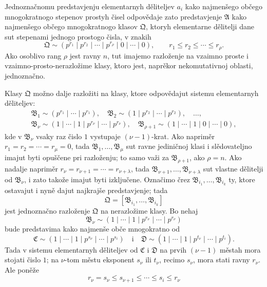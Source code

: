 \documentclass[11pt]{article}
\begin{document}
Jednoznačnomu predstavjenju elementarnyh děliteljev \(a_i\) kako najmenšego občego mnogokratnogo stepenov prostyh čisel odpovědaje zato predstavjenje \(\mathfrak A\) kako najmenšego občego mnogokratnogo klasov \(\mathfrak Q\), ktoryh elementarne dělitelji dane sut stepenami jednogo prostogo čisla, v znakih
\[
 \mathfrak Q\sim(p^{r_1}\mid p^{r_2}\mid\cdots\mid p^{r_\rho}\mid0\mid\cdots\mid0),
 \qquad r_1\le r_2\le\cdots\le r_\rho.
\]
Ako osoblivo rang \(\rho\) jest ravny \(n\), tut imajemo razloženje na vzaimno proste i vzaimno-prosto-nerazložime klasy, ktoro jest, naprěkor nekomutativnoj oblasti, jednoznačno.

Klasy \(\mathfrak Q\) možno dalje razložiti na klasy, ktore odpovědajut sistemu elementarnyh děliteljev:
\[
\begin{gathered}
 \mathfrak B_1\sim(p^{r_1}\mid\cdots\mid p^{r_1}),\quad
 \mathfrak B_2\sim(1\mid p^{r_2}\mid\cdots\mid p^{r_2}),\quad \ldots,\\
 \mathfrak B_\nu\sim(1\mid\cdots\mid1\mid p^{r_\nu}\mid\cdots\mid p^{r_\nu}),\quad
 \mathfrak B_{\rho+1}\sim(1\mid\cdots\mid1\mid0\mid\cdots\mid0),
\end{gathered}
\]
kde v \(\mathfrak B_\nu\) vsaky raz čislo \(1\) vystupaje \((\nu-1)\)-krat. Ako napriměr \(r_1=r_2=\cdots=r_\mu=0\), tada \(\mathfrak B_1,\ldots,\mathfrak B_\mu\) sut ravne jediničnoj klasi i slědovateljno imajut byti opuščene pri razloženju; to samo važi za \(\mathfrak B_{\rho+1}\), ako \(\rho=n\). Ako nadalje napriměr \(r_\nu=r_{\nu+1}=\cdots=r_{\nu+\lambda}\), tada \(\mathfrak B_{\nu+1},\ldots,\mathfrak B_{\nu+\lambda}\) sut vlastne dělitelji od \(\mathfrak B_\nu\), i zato takože imajut byti izključene. Označimo črez \(\mathfrak B_{i_1},\ldots,\mathfrak B_{i_k}\) ty, ktore ostavajut i nyně dajut najkrajše predstavjenje; tada
\[
 \mathfrak Q=[\mathfrak B_{i_1},
\ldots,\mathfrak B_{i_k}]
\]
jest jednoznačno razloženje \(\mathfrak Q\) na nerazložime klasy. Bo nehaj
\[
 \mathfrak B_\nu\sim(1\mid\cdots\mid1\mid p^{r_\nu}\mid\cdots\mid p^{r_\nu})
\]
bude predstavima kako najmenše obče mnogokratno od
\[
 \mathfrak C\sim(1\mid\cdots\mid1\mid p^{s_\nu}\mid\cdots\mid p^{s_i})
 \quad\text{i}\quad
 \mathfrak D\sim(1\mid\cdots\mid1\mid p^{t_\nu}\mid\cdots\mid p^{t_i}).
\]
Tada v sistemu elementarnyh děliteljev od \(\mathfrak C\) i \(\mathfrak D\) na prvih \((\nu-1)\) městah mora stojati čislo \(1\); na \(\nu\)-tom městu eksponent \(s_\nu\) ili \(t_\nu\), recimo \(s_\nu\), mora stati ravny \(r_\nu\). Ale poněže
\[
 r_\nu=s_\nu\le s_{\nu+1}\le\cdots\le s_i\le r_\nu
\]
\end{document}
